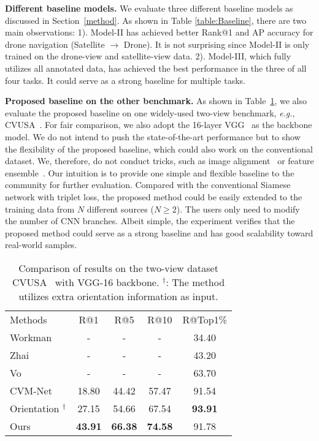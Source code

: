 \documentclass[sigconf]{acmart}
\def\eg{\emph{e.g.}}
\begin{document}
\noindent\textbf{Different baseline models.} 
We evaluate three different baseline models as discussed in Section~\ref{method}. As shown in Table \ref{table:Baseline}, there are two main observations: 
1). Model-II has achieved better Rank@1 and AP accuracy for drone navigation (Satellite $\rightarrow$ Drone). It is not surprising since Model-II is only trained on the drone-view and satellite-view data. 2). Model-III, which fully utilizes all annotated data, has achieved the best performance in the three of all four tasks. It could serve as a strong baseline for multiple tasks. 

\noindent\textbf{Proposed baseline on the other benchmark.} 
As shown in Table~\ref{table:usa}, we also evaluate the proposed baseline on one widely-used two-view benchmark, \eg, CVUSA~\cite{zhai2017predicting}. For fair comparison, we also adopt the 16-layer VGG~\cite{simonyan2014very} as the backbone model. We do not intend to push the state-of-the-art performance but to show the flexibility of the proposed baseline, which could also work on the conventional dataset. We, therefore, do not conduct tricks, such as image alignment~\cite{shi2019spatial} or feature ensemble~\cite{regmi2019bridging}.
Our intuition is to provide one simple and flexible baseline to the community for further evaluation. Compared with the conventional Siamese network with triplet loss, the proposed method could be easily extended to the training data from $N$ different sources ($N\geq2$). 
The users only need to modify the number of CNN branches. Albeit simple, the experiment verifies that the proposed method could serve as a strong baseline and has good scalability toward real-world samples.

\setlength{\tabcolsep}{9pt}
\begin{table}
\small
\begin{center}
\begin{tabular}{l|cccc}
\hline
Methods  & R@1 & R@5 & R@10 & R@Top1\%\\
\shline
Workman \cite{workman2015wide} & - & - & - & 34.40 \\
Zhai \cite{zhai2017predicting} & - & - & - & 43.20 \\
Vo \cite{vo2016localizing} & - & - & - & 63.70 \\
CVM-Net \cite{hu2018cvm} & 18.80 & 44.42 & 57.47 & 91.54 \\
Orientation \cite{liu2019lending}$^\dagger$ & 27.15 & 54.66 & 67.54 & \textbf{93.91} \\
Ours  & \textbf{43.91} & \textbf{66.38} & \textbf{74.58} & 91.78 \\
\hline
\end{tabular}
\end{center}
\caption{ Comparison of results on the two-view dataset CVUSA~\cite{zhai2017predicting} with VGG-16 backbone. $^\dagger$: The method utilizes extra orientation information as input.
}
\label{table:usa}
\end{table}
\end{document}
